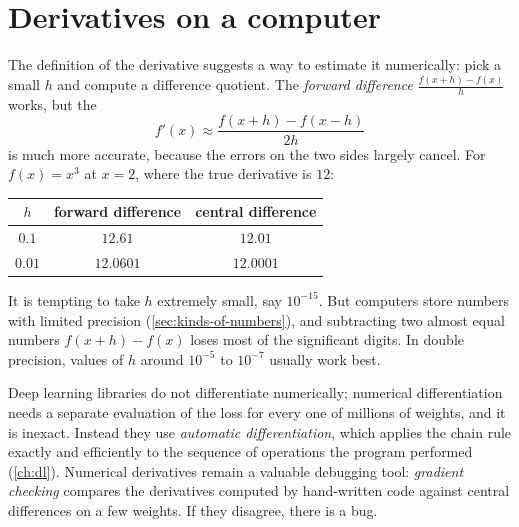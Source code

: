 \section{Derivatives on a computer}\label{sec:numerical-derivatives}

The definition of the derivative suggests a way to estimate it numerically:
pick a small $h$ and compute a difference quotient. The \emph{forward
difference} $\frac{f(x + h) - f(x)}{h}$ works, but the 
\[
  f'(x) \approx \frac{f(x + h) - f(x - h)}{2h}
\]
is much more accurate, because the errors on the two sides largely cancel. For
$f(x) = x^3$ at $x = 2$, where the true derivative is $12$:
\begin{center}
\begin{tabular}{c|cc}
$h$ & forward difference & central difference\\
\hline
$0.1$ & $12.61$ & $12.01$\\
$0.01$ & $12.0601$ & $12.0001$
\end{tabular}
\end{center}

\begin{pitfall}
It is tempting to take $h$ extremely small, say $10^{-15}$. But computers store
numbers with limited precision (\cref{sec:kinds-of-numbers}), and subtracting
two almost equal numbers $f(x + h) - f(x)$ loses most of the significant digits.
In double precision, values of $h$ around $10^{-5}$ to $10^{-7}$ usually work
best.
\end{pitfall}

\begin{mlnote}
Deep learning libraries do not differentiate numerically; numerical
differentiation needs a separate evaluation of the loss for every one of
millions of weights, and it is inexact. Instead they use \emph{automatic
differentiation}, which applies the chain rule exactly and efficiently to the
sequence of operations the program performed (\cref{ch:dl}). Numerical
derivatives remain a valuable debugging tool: \emph{gradient checking} compares
the derivatives computed by hand-written code against central differences on a
few weights. If they disagree, there is a bug.
\end{mlnote}

\sectionexercises

